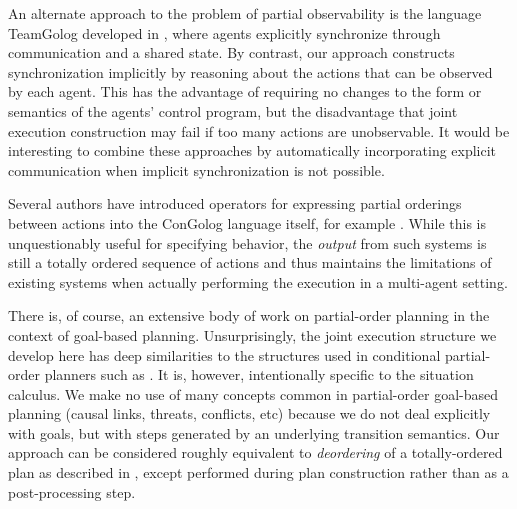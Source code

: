 An alternate approach to the problem of partial observability is the
language TeamGolog developed in \citep{farinelli07team_golog}, where
agents explicitly synchronize through communication and a shared state.
By contrast, our approach constructs synchronization implicitly by
reasoning about the actions that can be observed by each agent. This
has the advantage of requiring no changes to the form or semantics
of the agents' control program, but the disadvantage that joint execution
construction may fail if too many actions are unobservable. It would
be interesting to combine these approaches by automatically incorporating
explicit communication when implicit synchronization is not possible.

Several authors have introduced operators for expressing partial orderings
between actions into the ConGolog language itself, for example \citep{son00htn_golog}.
While this is unquestionably useful for specifying behavior, the \emph{output}
from such systems is still a totally ordered sequence of actions and
thus maintains the limitations of existing systems when actually performing
the execution in a multi-agent setting.

There is, of course, an extensive body of work on partial-order planning
in the context of goal-based planning. Unsurprisingly, the joint execution
structure we develop here has deep similarities to the structures
used in conditional partial-order planners such as \citep{peot92conditional_nonlinear}.
It is, however, intentionally specific to the situation calculus.
We make no use of many concepts common in partial-order goal-based
planning (causal links, threats, conflicts, etc) because we do not
deal explicitly with goals, but with steps generated by an underlying
transition semantics. Our approach can be considered roughly equivalent
to \emph{deordering} of a totally-ordered plan as described in \citep{backstrom99reordering},
except performed during plan construction rather than as a post-processing
step.  

